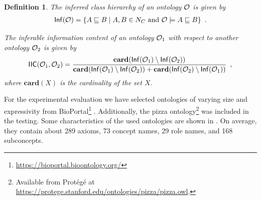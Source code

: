 \documentclass[
]{ceurart}
\newtheorem{definition}{Definition}
\begin{document}
\begin{definition}
  The \emph{inferred class hierarchy} of an ontology $\mathcal{O}$ is given by
  {\footnotesize
  \begin{align*}
    {\ensuremath{\mathsf{Inf}}}(\mathcal{O}) = \{ A \sqsubseteq B \mid A, B \in N_C \text{ and } \mathcal{O} \models A \sqsubseteq B \} \enspace.
  \end{align*}
  }

  The \emph{inferable information content} of an ontology $\mathcal{O}_1$ with respect to another ontology $\mathcal{O}_2$ is given by
  {\footnotesize
  \begin{align*}
    {\ensuremath{\mathsf{IIC}}}(\mathcal{O}_1, \mathcal{O}_2) = \frac{\mathbf{card}({\mathsf{Inf}}(\mathcal{O}_1) \setminus {\ensuremath{\mathsf{Inf}}}(\mathcal{O}_2))}{\mathbf{card}({\mathsf{Inf}}(\mathcal{O}_1) \setminus {\ensuremath{\mathsf{Inf}}}(\mathcal{O}_2)) + \mathbf{card}({\mathsf{Inf}}(\mathcal{O}_2) \setminus {\ensuremath{\mathsf{Inf}}}(\mathcal{O}_1))} \enspace,
  \end{align*}
  }
  where $\mathbf{card}(X)$ is the cardinality of the set $X$.
\end{definition}

For the experimental evaluation we have selected ontologies of varying size and expressivity from BioPortal\footnote{\url{https://bioportal.bioontology.org/}} \cite{whetzel2011bioportal}. Additionally, the pizza ontology\footnote{Available from Protégé at \url{https://protege.stanford.edu/ontologies/pizza/pizza.owl}.} was included in the testing. Some characteristics of the used ontologies are shown in . On average, they contain about 289 axioms, 73 concept names, 29 role names, and 168 subconcepts.
\end{document}
